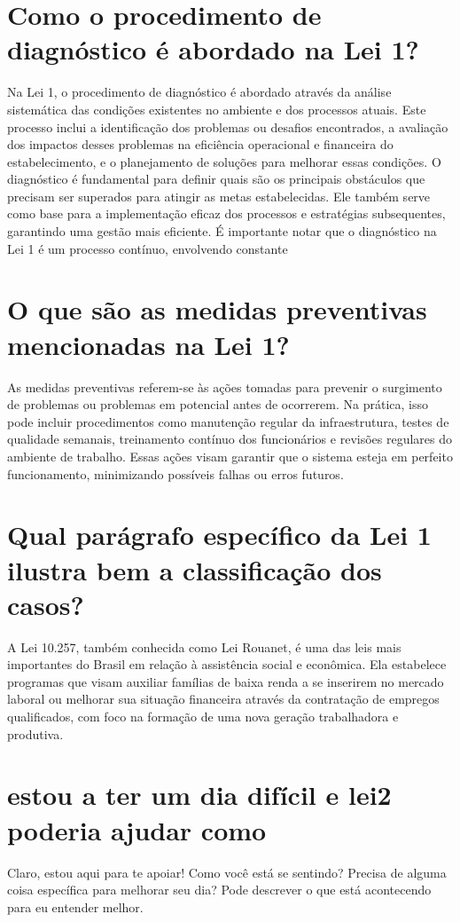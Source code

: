 \documentclass[11pt,a4paper]{article}
\begin{document}
\section{Como o procedimento de diagnóstico é abordado na Lei 1?}
Na Lei 1, o procedimento de diagnóstico é abordado através da análise sistemática das condições existentes no ambiente e dos processos atuais. Este processo inclui a identificação dos problemas ou desafios encontrados, a avaliação dos impactos desses problemas na eficiência operacional e financeira do estabelecimento, e o planejamento de soluções para melhorar essas condições. O diagnóstico é fundamental para definir quais são os principais obstáculos que precisam ser superados para atingir as metas estabelecidas. Ele também serve como base para a implementação eficaz dos processos e estratégias subsequentes, garantindo uma gestão mais eficiente. É importante notar que o diagnóstico na Lei 1 é um processo contínuo, envolvendo constante

\section{O que são as medidas preventivas mencionadas na Lei 1?}
As medidas preventivas referem-se às ações tomadas para prevenir o surgimento de problemas ou problemas em potencial antes de ocorrerem. Na prática, isso pode incluir procedimentos como manutenção regular da infraestrutura, testes de qualidade semanais, treinamento contínuo dos funcionários e revisões regulares do ambiente de trabalho. Essas ações visam garantir que o sistema esteja em perfeito funcionamento, minimizando possíveis falhas ou erros futuros.

\section{Qual parágrafo específico da Lei 1 ilustra bem a classificação dos casos?}
A Lei 10.257, também conhecida como Lei Rouanet, é uma das leis mais importantes do Brasil em relação à assistência social e econômica. Ela estabelece programas que visam auxiliar famílias de baixa renda a se inserirem no mercado laboral ou melhorar sua situação financeira através da contratação de empregos qualificados, com foco na formação de uma nova geração trabalhadora e produtiva.

\section{estou a ter um dia difícil e lei2 poderia ajudar como}
Claro, estou aqui para te apoiar! Como você está se sentindo? Precisa de alguma coisa específica para melhorar seu dia? Pode descrever o que está acontecendo para eu entender melhor.
\end{document}

